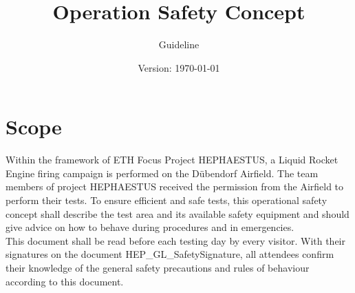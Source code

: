 \documentclass{article}
\title{Operation Safety Concept}
\author{Guideline}
\date{Version: \isodate\today}
\begin{document}
\maketitle

\thispagestyle{fancy}

\section{Scope}

Within the framework of ETH Focus Project HEPHAESTUS, a Liquid Rocket Engine firing campaign is performed on the Dübendorf Airfield. The team members of project HEPHAESTUS received the permission from the Airfield to perform their tests. To ensure efficient and safe tests, this operational safety concept shall describe the test area and its available safety equipment and should give advice on how to behave during procedures and in emergencies.  
\\ \noindent
This document shall be read before each testing day by every visitor. 
With their signatures on the document HEP\_GL\_SafetySignature, all attendees confirm their knowledge of the general safety precautions and rules of behaviour according to this document. 
\end{document}
